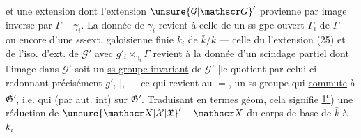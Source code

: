 et une extension
dont l’extension $\unsure{\mathcal G|\mathscr G}'$ provienne  par image inverse par $\Gamma\mathbin{-}\gamma_i$. La donnée de $\gamma_i$ revient à celle de un ss-gpe  ouvert $\Gamma_i$ de $\Gamma$ --- ou encore d’une ss-ext. galoisienne finie $k_i$  de $\bar k/k$ --- celle du  l’extension (25) et de l’iso. d’ext. de $\mathcal G'$ avec $g'_i\times_{\gamma_i}\Gamma$ revient à la donnée d’un  scindage partiel
dont l’image dans $\mathcal G'$ soit un \uline{ss-groupe invariant} de $\mathcal G'$ [le quotient par celui-ci redonnant précisément $g'_i$ ], --- ce qui revient au $=$, un ss-groupe qui \uline{commute} à $\mathfrak G'$, i.e. qui  \uline{} (par aut. int) sur $\mathfrak G'$. Traduisant en termes géom, cela signifie \uline{1\textsuperscript{o}}) une réduction de $\unsure{\mathscr X|\mathcal X|\mathfrak X}'\mathbin{-}\mathscr X$ du corps de base de $\bar k$ à $k_i$
